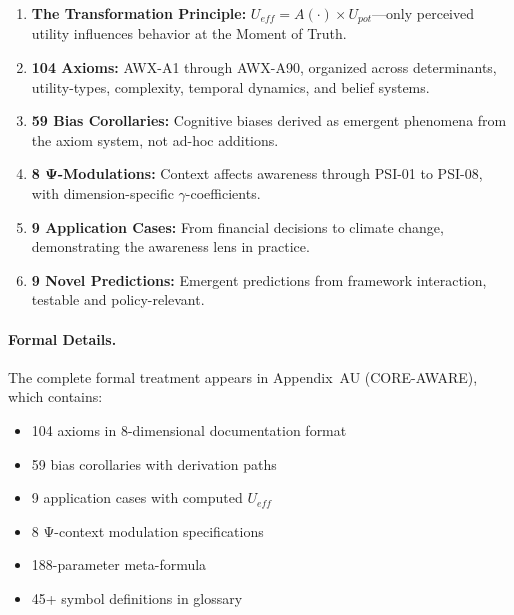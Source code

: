 \begin{enumerate}
    \item \textbf{The Transformation Principle:} $U_{eff} = A(\cdot) \times U_{pot}$---only
          perceived utility influences behavior at the Moment of Truth.

    \item \textbf{104 Axioms:} AWX-A1 through AWX-A90, organized across determinants,
          utility-types, complexity, temporal dynamics, and belief systems.

    \item \textbf{59 Bias Corollaries:} Cognitive biases derived as emergent phenomena
          from the axiom system, not ad-hoc additions.

    \item \textbf{8 Ψ-Modulations:} Context affects awareness through PSI-01 to PSI-08,
          with dimension-specific $\gamma$-coefficients.

    \item \textbf{9 Application Cases:} From financial decisions to climate change,
          demonstrating the awareness lens in practice.

    \item \textbf{9 Novel Predictions:} Emergent predictions from framework interaction,
          testable and policy-relevant.
\end{enumerate}

\paragraph{Formal Details.}
The complete formal treatment appears in Appendix~AU (CORE-AWARE), which contains:
\begin{itemize}[nosep]
    \item 104 axioms in 8-dimensional documentation format
    \item 59 bias corollaries with derivation paths
    \item 9 application cases with computed $U_{eff}$
    \item 8 Ψ-context modulation specifications
    \item 188-parameter meta-formula
    \item 45+ symbol definitions in glossary
\end{itemize}

